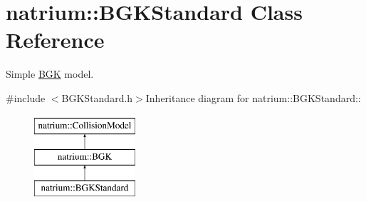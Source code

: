 \hypertarget{classnatrium_1_1BGKStandard}{
\section{natrium::BGKStandard Class Reference}
\label{classnatrium_1_1BGKStandard}
}


Simple \hyperlink{classnatrium_1_1BGK}{BGK} model.  


{\ttfamily \#include $<$BGKStandard.h$>$}Inheritance diagram for natrium::BGKStandard::\begin{figure}[H]
\begin{center}
\leavevmode
\includegraphics[height=3cm]{classnatrium_1_1BGKStandard}
\end{center}
\end{figure}
